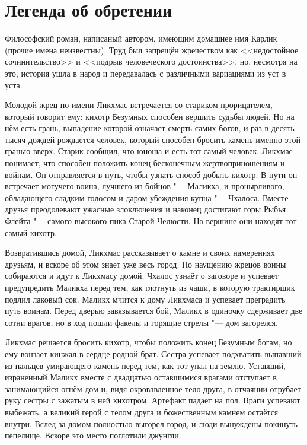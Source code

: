 \documentclass[a4paper,10pt]{book}
\begin{document}
\section{Легенда об обретении}

Философский роман, написаный автором, имеющим домашнее имя Карлик 
(прочие имена неизвестны). Труд был запрещён жречеством как <<недостойное 
сочинительство>> и <<подрыв человеческого достоинства>>, но, несмотря на это, 
история ушла в народ и передавалась с различными вариациями из уст в уста.

Молодой жрец по имени Ликхмас встречается со стариком-прорицателем, который 
говорит ему: кихотр Безумных способен вершить судьбы людей. Но на нём есть 
грань, выпадение которой означает смерть самих богов, и раз в десять тысяч 
дождей рождается человек, который способен бросить камень именно этой гранью 
вверх. Старик сообщил, что юноша и есть тот самый человек. Ликхмас понимает, 
что способен положить конец бесконечным жертвоприношениям и войнам. Он 
отправляется в путь, чтобы узнать способ добыть кихотр. В пути он встречает 
могучего воина, лучшего из бойцов "--- Маликха, и пронырливого, обладающего 
сладким голосом и даром убеждения купца "--- Чхалоса. Вместе друзья 
преодолевают 
ужасные злоключения и наконец достигают горы Рыбья Флейта "--- самого высокого 
пика Старой Челюсти. На вершине они находят тот самый кихотр.

Возвратившись домой, Ликхмас рассказывает 
о камне и своих намерениях друзьям, и вскоре об этом знает уже весь город. По 
наущению жрецов воины собираются и идут к Ликхмасу домой. Чхалос узнаёт о 
заговоре и успевает предупредить Маликха перед тем, как глотнуть из чаши, в 
которую трактирщик подлил лаковый сок. Маликх мчится 
к дому Ликхмаса и успевает преградить путь воинам. Перед дверью завязывается 
бой, Маликх в одиночку сдерживает две сотни врагов, но в ход пошли факелы и 
горящие стрелы "--- дом загорелся.

Ликхмас решается бросить кихотр, чтобы положить 
конец Безумным богам, но ему вонзает кинжал в сердце родной брат. 
Сестра успевает подхватить выпавший из пальцев умирающего камень перед тем, как 
тот упал на землю. Уставший, израненный Маликх вместе с двадцатью оставшимися 
врагами отступает в занимающийся огнём дом и, видя окровавленное тело друга, в 
отчаянии отрубает руку сестры с зажатым в ней кихотром. Артефакт падает на пол. 
Враги успевают выбежать, а великий герой с телом друга и божественным камнем 
остаётся внутри. Вслед за домом полностью выгорел город, и люди вынуждены 
покинуть пепелище. Вскоре это место поглотили джунгли.
\end{document}
